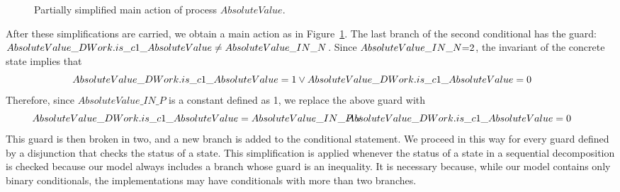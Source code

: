 \documentclass[submission]{eptcs}
\renewcommand{\circblockbegin}{\left(\begin{array}{l}}
\renewcommand{\circblockend}{\end{array}\right)}
\begin{document}
\begin{figure}[!h]
\begin{minipage}{\textwidth}
\begin{small}
\end{small}
\end{minipage}
\caption{Partially simplified main action of process $AbsoluteValue$.}
\label{fig:main-action-pre-final}
\end{figure}

After these simplifications are carried, we obtain a main action as in Figure~\ref{fig:main-action-pre-final}. The last branch of the second conditional has the guard: $AbsoluteValue\_DWork.is\_c1\_AbsoluteValue \neq AbsoluteValue\small{\_IN\_N}$. Since $\small{AbsoluteValue\_IN\_N}\small{ = }2$, the invariant of the concrete state implies that
\[\hspace{-.6cm}AbsoluteValue\_DWork.is\_c1\_AbsoluteValue = 1 \lor AbsoluteValue\_DWork.is\_c1\_AbsoluteValue = 0\]
Therefore, since $AbsoluteValue\_IN\_P$ is a constant defined as 1, we replace the above guard with 
\[\hspace{-.6cm}AbsoluteValue\_DWork.is\_c1\_AbsoluteValue = AbsoluteValue\_IN\_P \lor\\
\hspace{-.6cm}AbsoluteValue\_DWork.is\_c1\_AbsoluteValue = 0\]
This guard is then broken in two, and a new branch is added to the conditional statement. We proceed in this way for every guard defined by a disjunction that checks the status of a state. This simplification is applied whenever the status of a state in a sequential decomposition is checked because our model always includes a branch whose guard is an inequality. It is necessary because, while our model contains only binary conditionals, the implementations may have conditionals with more than two branches.
\end{document}
